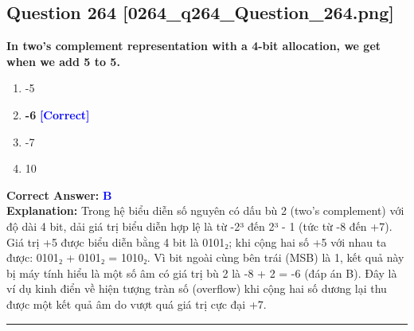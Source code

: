 \documentclass[11pt,a4paper]{article}
\begin{document}
\begin{minipage}{\textwidth}
\subsection*{Question 264 \quad \footnotesize{[0264\_q264\_Question\_264.png]}}
\noindent \textbf{In two's complement representation with a 4-bit allocation, we get when we add 5 to 5.}

\begin{enumerate}[label=\Alph*.]
    \item -5
    \item \textbf{-6} \hfill \textcolor{blue}{\textbf{[Correct]}}
    \item -7
    \item 10
\end{enumerate}

\noindent \textbf{Correct Answer:} \textcolor{blue}{\textbf{B}} \\[2pt]
\noindent \textbf{Explanation:} Trong hệ biểu diễn số nguyên có dấu bù 2 (two's complement) với độ dài 4 bit, dải giá trị biểu diễn hợp lệ là từ -2³ đến 2³ - 1 (tức từ -8 đến +7). Giá trị +5 được biểu diễn bằng 4 bit là 0101₂; khi cộng hai số +5 với nhau ta được: 0101₂ + 0101₂ = 1010₂. Vì bit ngoài cùng bên trái (MSB) là 1, kết quả này bị máy tính hiểu là một số âm có giá trị bù 2 là -8 + 2 = -6 (đáp án B). Đây là ví dụ kinh điển về hiện tượng tràn số (overflow) khi cộng hai số dương lại thu được một kết quả âm do vượt quá giá trị cực đại +7.

\par\vspace{0.3cm}
\hrule
\vspace{0.3cm}
\end{minipage}
\end{document}
